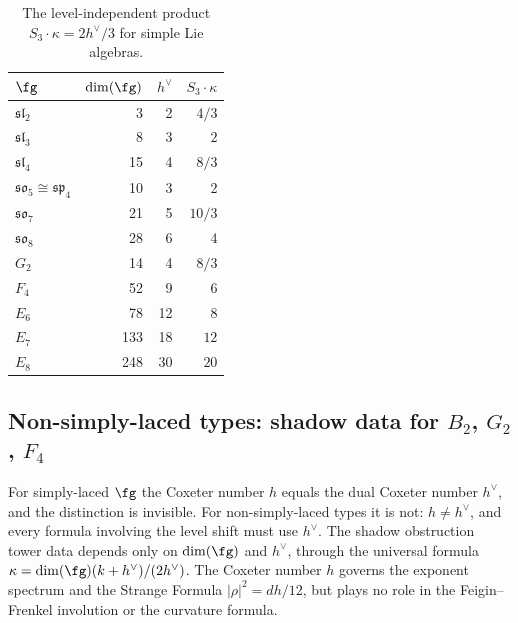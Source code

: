 \begin{table}[ht]
\centering
\caption{The level-independent product
$S_3 \cdot \kappa = 2h^\vee/3$ for simple Lie
algebras.}\label{tab:km-S3-kappa-table}
\begin{tabular}{lrrr}
\toprule
$\fg$ & $\dim(\fg)$ & $h^\vee$ & $S_3\cdot\kappa$ \\
\midrule
$\mathfrak{sl}_2$ & 3 & 2 & $4/3$ \\
$\mathfrak{sl}_3$ & 8 & 3 & $2$ \\
$\mathfrak{sl}_4$ & 15 & 4 & $8/3$ \\
$\mathfrak{so}_5 \cong \mathfrak{sp}_4$ & 10 & 3 & $2$ \\
$\mathfrak{so}_7$ & 21 & 5 & $10/3$ \\
$\mathfrak{so}_8$ & 28 & 6 & $4$ \\
$G_2$ & 14 & 4 & $8/3$ \\
$F_4$ & 52 & 9 & $6$ \\
$E_6$ & 78 & 12 & $8$ \\
$E_7$ & 133 & 18 & $12$ \\
$E_8$ & 248 & 30 & $20$ \\
\bottomrule
\end{tabular}
\end{table}

\subsection{Non-simply-laced types: shadow data for
\texorpdfstring{$B_2$, $G_2$, $F_4$}{B2, G2, F4}}%
\label{subsec:nsl-shadow-data}

For simply-laced $\fg$ the Coxeter number $h$ equals the dual
Coxeter number $h^\vee$, and the distinction is invisible. For
non-simply-laced types it is not: $h \neq h^\vee$, and every formula
involving the level shift must use $h^\vee$. The shadow obstruction tower
data depends only on $\dim(\fg)$ and $h^\vee$, through the universal
formula $\kappa = \dim(\fg)(k+h^\vee)/(2h^\vee)$. The Coxeter
number $h$ governs the exponent spectrum and the Strange Formula
$|\rho|^2 = dh/12$, but plays no role in the Feigin--Frenkel
involution or the curvature formula.

